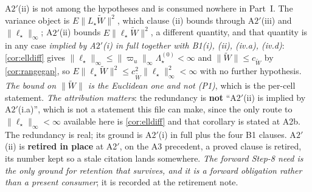\begin{lemma}[{The moment is valid, its variance is finite, its $\theta$-Jacobian is $-J$, and $J=E[\Delta Z\Delta Z']$}]
A$2'$\textup{(ii)} is not among the hypotheses and is consumed nowhere in Part~I. The variance object
is $E\|L_\star\widetilde W\|^{2}$, which clause (ii) bounds through A$2'$(iii) and
$\|\ell_\star\|_\infty$; A$2'$(ii) bounds $E\|\ell_\star\widetilde W\|^{2}$, a different quantity, and
that quantity is in any case \emph{implied by A$2'$\textup{(i)} in full together with B1(i), (ii), (iv.a), (iv.d)}:
\cref{cor:elldiff} gives $\|\ell_\star\|_\infty\le\|\varpi_u\|_\infty\Lambda^{(0)}_\star<\infty$ and
$\|\widetilde W\|\le c_{\widetilde W}$ by \cref{cor:rangegap}, so
$E\|\ell_\star\widetilde W\|^{2}\le c_{\widetilde W}^{2}\|\ell_\star\|_\infty^{2}<\infty$ with no
further hypothesis. \emph{The bound on $\|\widetilde W\|$ is the Euclidean one and not \textup{(P1)}},
which is the per-cell statement.
\emph{The attribution matters}: the redundancy is \textbf{not} ``A$2'$(ii)
is implied by A$2'$(i.a)'', which is not a statement this file can make, since the only route to
$\|\ell_\star\|_\infty<\infty$ available here is \cref{cor:elldiff} and that corollary is stated at A2b.
The redundancy is real; its ground is A$2'$(i) in full plus the four B1 clauses.
A$2'$(ii) is \textbf{retired in place} at A2$'$, on the
A3 precedent, a proved clause is retired, its number kept so a stale citation lands
somewhere. \emph{The forward
Step-8 need is the only ground for retention that survives, and it is a forward obligation rather than a
present consumer}; it is recorded at the retirement note.
\end{lemma}


